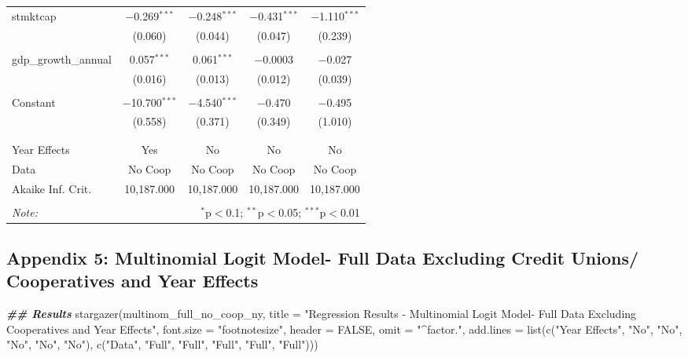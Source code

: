 \documentclass[a4paper,nobind]{templates/ociamthesis}
\newenvironment{Shaded}{\begin{snugshade}}{\end{snugshade}}
\newcommand{\AttributeTok}[1]{\textcolor[rgb]{0.77,0.63,0.00}{#1}}
\newcommand{\ConstantTok}[1]{\textcolor[rgb]{0.00,0.00,0.00}{#1}}
\newcommand{\DocumentationTok}[1]{\textcolor[rgb]{0.56,0.35,0.01}{\textbf{\textit{#1}}}}
\newcommand{\FunctionTok}[1]{\textcolor[rgb]{0.00,0.00,0.00}{#1}}
\newcommand{\NormalTok}[1]{#1}
\newcommand{\StringTok}[1]{\textcolor[rgb]{0.31,0.60,0.02}{#1}}
\renewenvironment{Shaded}
{
  \vspace{10pt}%
  \begin{snugshade}%
}{%
  \end{snugshade}%
  \vspace{8pt}%
}
\begin{document}
\begin{table}[!htbp]
\begin{tabular}{@{\extracolsep{5pt}}lcccc}
 stmktcap & $-$0.269$^{***}$ & $-$0.248$^{***}$ & $-$0.431$^{***}$ & $-$1.110$^{***}$ \\ 
  & (0.060) & (0.044) & (0.047) & (0.239) \\ 
  & & & & \\ 
 gdp\_growth\_annual & 0.057$^{***}$ & 0.061$^{***}$ & $-$0.0003 & $-$0.027 \\ 
  & (0.016) & (0.013) & (0.012) & (0.039) \\ 
  & & & & \\ 
 Constant & $-$10.700$^{***}$ & $-$4.540$^{***}$ & $-$0.470 & $-$0.495 \\ 
  & (0.558) & (0.371) & (0.349) & (1.010) \\ 
  & & & & \\ 
\hline \\[-1.8ex] 
Year Effects & Yes & No & No & No \\ 
Data & No Coop & No Coop & No Coop & No Coop \\ 
Akaike Inf. Crit. & 10,187.000 & 10,187.000 & 10,187.000 & 10,187.000 \\ 
\hline 
\hline \\[-1.8ex] 
\textit{Note:}  & \multicolumn{4}{r}{$^{*}$p$<$0.1; $^{**}$p$<$0.05; $^{***}$p$<$0.01} \\ 
\end{tabular} 
\end{table}

\newpage

\hypertarget{appendix-5-multinomial-logit-model--full-data-excluding-credit-unions-cooperatives-and-year-effects}{%
\subsection{Appendix 5: Multinomial Logit Model- Full Data Excluding Credit Unions/ Cooperatives and Year Effects}\label{appendix-5-multinomial-logit-model--full-data-excluding-credit-unions-cooperatives-and-year-effects}}

\begin{Shaded}
\begin{Highlighting}[]
\DocumentationTok{\#\# Results }
\FunctionTok{stargazer}\NormalTok{(multinom\_full\_no\_coop\_ny, }\AttributeTok{title =} \StringTok{"Regression Results {-} Multinomial Logit Model{-} Full Data Excluding Cooperatives and Year Effects"}\NormalTok{, }\AttributeTok{font.size =} \StringTok{"footnotesize"}\NormalTok{, }\AttributeTok{header =} \ConstantTok{FALSE}\NormalTok{, }\AttributeTok{omit =} \StringTok{"\^{}factor."}\NormalTok{, }\AttributeTok{add.lines =} \FunctionTok{list}\NormalTok{(}\FunctionTok{c}\NormalTok{(}\StringTok{"Year Effects"}\NormalTok{, }\StringTok{"No"}\NormalTok{, }\StringTok{"No"}\NormalTok{, }\StringTok{"No"}\NormalTok{, }\StringTok{"No"}\NormalTok{, }\StringTok{"No"}\NormalTok{), }\FunctionTok{c}\NormalTok{(}\StringTok{"Data"}\NormalTok{, }\StringTok{"Full"}\NormalTok{, }\StringTok{"Full"}\NormalTok{, }\StringTok{"Full"}\NormalTok{, }\StringTok{"Full"}\NormalTok{, }\StringTok{"Full"}\NormalTok{)))}
\end{Highlighting}
\end{Shaded}
\end{document}
